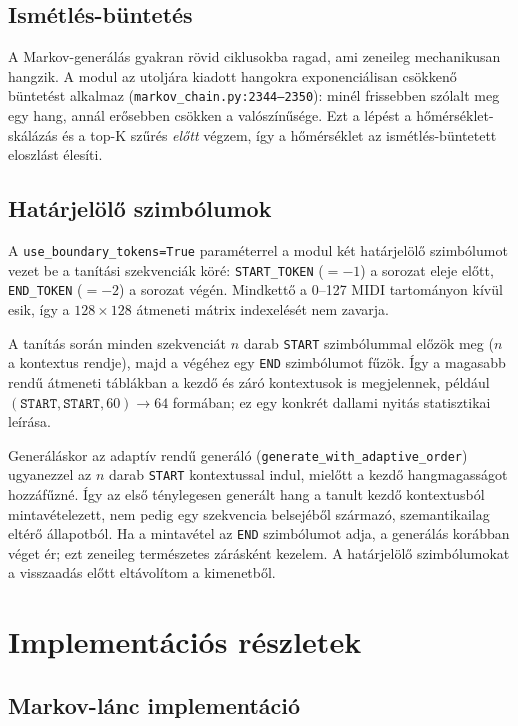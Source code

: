 \subsection{Ismétlés-büntetés}

A Markov-generálás gyakran rövid ciklusokba ragad, ami zeneileg mechanikusan hangzik. A modul az utoljára kiadott hangokra exponenciálisan csökkenő büntetést alkalmaz (\texttt{markov\_chain.py:2344--2350}): minél frissebben szólalt meg egy hang, annál erősebben csökken a valószínűsége. Ezt a lépést a hőmérséklet-skálázás és a top-K szűrés \emph{előtt} végzem, így a hőmérséklet az ismétlés-büntetett eloszlást élesíti.

\subsection{Határjelölő szimbólumok}

A \texttt{use\_boundary\_tokens=True} paraméterrel a modul két határjelölő szimbólumot vezet be a tanítási szekvenciák köré: \texttt{START\_TOKEN} ($=-1$) a sorozat eleje előtt, \texttt{END\_TOKEN} ($=-2$) a sorozat végén. Mindkettő a 0--127 MIDI tartományon kívül esik, így a $128 \times 128$ átmeneti mátrix indexelését nem zavarja.

A tanítás során minden szekvenciát $n$ darab \texttt{START} szimbólummal előzök meg ($n$ a kontextus rendje), majd a végéhez egy \texttt{END} szimbólumot fűzök. Így a magasabb rendű átmeneti táblákban a kezdő és záró kontextusok is megjelennek, például $(\texttt{START}, \texttt{START}, 60) \to 64$ formában; ez egy konkrét dallami nyitás statisztikai leírása.

Generáláskor az adaptív rendű generáló (\texttt{generate\_with\_adaptive\_order}) ugyanezzel az $n$ darab \texttt{START} kontextussal indul, mielőtt a kezdő hangmagasságot hozzáfűzné. Így az első ténylegesen generált hang a tanult kezdő kontextusból mintavételezett, nem pedig egy szekvencia belsejéből származó, szemantikailag eltérő állapotból. Ha a mintavétel az \texttt{END} szimbólumot adja, a generálás korábban véget ér; ezt zeneileg természetes zárásként kezelem. A határjelölő szimbólumokat a visszaadás előtt eltávolítom a kimenetből.

\section{Implementációs részletek}

\subsection{Markov-lánc implementáció}


